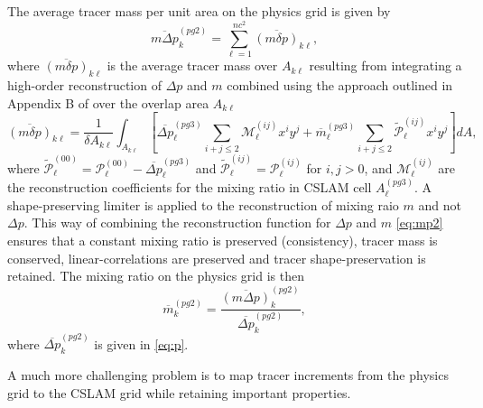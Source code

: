 The average tracer mass per unit area on the physics grid is given by
\begin{equation}
\label{eq:mp}
\overline{m\Delta p}^{(pg2)}_k=\sum_{\ell=1}^{nc^2}\overline{\left( m\delta p\right)}_{k\ell},
\end{equation}
where $\overline{\left( m\delta p\right)}_{k\ell}$ is the average tracer mass over $A_{k\ell}$ resulting from integrating a high-order reconstruction of $\Delta p$ and $m$ combined using the approach outlined in Appendix B of \cite{NL2010JCP} over the overlap area $A_{k\ell}$
\begin{equation}
\label{eq:mp2}
\overline{\left( m\delta p\right)}_{k\ell}=\frac{1}{\delta A_{k\ell}}\int_{A_{k\ell}}\left[ \overline{\Delta p}_\ell^{(pg3)}\sum_{i+j\le 2}{\mathcal{M}}^{(ij)}_\ell x^{i}y^{j}+{\overline{m}}_\ell^{(pg3)}\sum_{i+j\le 2}{\widetilde{{\mathcal{P}}}}^{(ij)}_\ell x^{i}y^{j}\right] dA,
\end{equation}
where ${\widetilde{{\mathcal{P}}}}^{(00)}_\ell={\mathcal{P}}^{(00)}_\ell-\overline{\Delta p}^{(pg3)}_\ell$ and ${\widetilde{{\mathcal{P}}}}^{(ij)}_\ell={\mathcal{P}}^{(ij)}_\ell$ for $i,j>0$, and ${\mathcal{M}}^{(ij)}_\ell$ are the reconstruction coefficients for the mixing ratio in CSLAM cell $A^{(pg3)}_\ell$. A shape-preserving limiter is applied to the reconstruction of mixing raio $m$ \citep{BJ1989} and not $\Delta p$. This way of combining the reconstruction function for $\Delta p$ and $m$ \eqref{eq:mp2} ensures that a constant mixing ratio is preserved (consistency), tracer mass is conserved, linear-correlations are preserved and tracer shape-preservation is retained. The mixing ratio on the physics grid is then
\begin{equation}
{\overline{m}}^{(pg2)}_k=\frac{\overline{\left( m\Delta p\right)}^{(pg2)}_k}{\overline{\Delta p}^{(pg2)}_k},
\end{equation}
where $\overline{\Delta p}^{(pg2)}_k$ is given in \eqref{eq:p}. 

A much more challenging problem is to map tracer increments from the physics grid to the CSLAM grid while retaining important properties.
